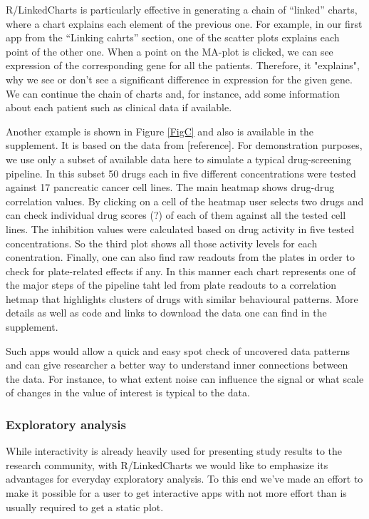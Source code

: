 \documentclass[twocolumn,10pt]{article}
\begin{document}
R/LinkedCharts is particularly effective in generating a chain of ``linked'' charts, where a chart explains each element of the previous one. For example, in our first app from the ``Linking cahrts'' section, one of the scatter plots explains each point of the other one. When a point on the MA-plot is clicked, we can see expression of the corresponding gene for all the patients. Therefore, it "explains", why we see or don't see a significant difference in expression for the given gene. We can continue the chain of charts and, for instance, add some information about each patient such as clinical data if available. 

Another example is shown in Figure \ref{FigC} and also is available in the supplement. It is based on the data from [reference].
For demonstration purposes, we use only a subset of available data here to simulate a typical drug-screening pipeline. In this subset 50 drugs each in five different concentrations were tested against 17 pancreatic cancer cell lines. The main heatmap shows drug-drug correlation values. By clicking on a cell of the heatmap user selects two drugs and can check individual drug scores (?) of each of them against all the tested cell lines. The inhibition values were calculated based on drug activity in five tested concentrations. So the third plot shows all those activity levels for each conentration. Finally, one can also find raw readouts from the plates in order to check for plate-related effects if any. In this manner each chart represents one of the major steps of the pipeline taht led from plate readouts to a correlation hetmap that highlights clusters of drugs with similar behavioural patterns. More details as well as code and links to download the data one can find in the supplement. 

Such apps would allow a quick and easy spot check of uncovered data patterns and can give researcher a better way to understand inner connections between the data. For instance, to what extent noise can influence the signal or what scale of changes in the value of interest is typical to the data.

\subsubsection{Exploratory analysis}

While interactivity is already heavily used for presenting study results to the research community, with R/LinkedCharts we would like to emphasize its advantages for everyday exploratory analysis. To this end we've made an effort to make it possible for a user to get interactive apps with not more effort than is usually required to get a static plot.
\end{document}
